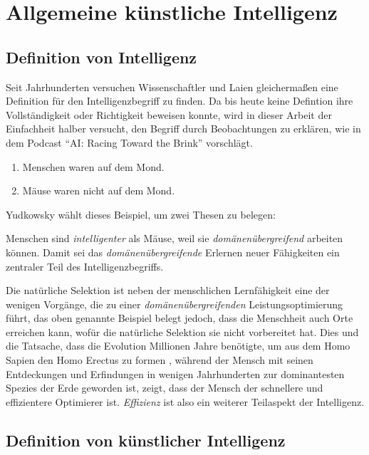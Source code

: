 \chapter{Allgemeine künstliche Intelligenz}
\section{Definition von Intelligenz}
Seit Jahrhunderten versuchen Wissenschaftler und Laien gleichermaßen eine Definition für den Intelligenzbegriff zu finden. Da bis heute keine Defintion ihre Vollständigkeit oder Richtigkeit beweisen konnte, wird in dieser Arbeit der Einfachheit halber versucht, den Begriff durch Beobachtungen zu erklären, wie \citeauthor{EliezerPodcast} in dem Podcast \enquote{AI: Racing Toward the Brink} vorschlägt. 
\begin{enumerate}
\item Menschen waren auf dem Mond.
\item Mäuse waren nicht auf dem Mond.
\end{enumerate}
Yudkowsky wählt dieses Beispiel, um zwei Thesen zu belegen:

Menschen sind \emph{intelligenter} als Mäuse, weil sie \emph{domänenübergreifend} arbeiten können. Damit sei das \emph{domänenübergreifende} Erlernen neuer Fähigkeiten ein zentraler Teil des Intelligenzbegriffs.


Die natürliche Selektion ist neben der menschlichen Lernfähigkeit eine der wenigen Vorgänge, die zu einer \emph{domänenübergreifenden} Leistungsoptimierung führt, das oben genannte Beispiel belegt jedoch, dass die Menschheit auch Orte erreichen kann, wofür die natürliche Selektion sie nicht vorbereitet hat. Dies und die Tatsache, dass die Evolution Millionen Jahre benötigte, um aus dem Homo Sapien den Homo Erectus zu formen , während der Mensch mit seinen Entdeckungen und Erfindungen in wenigen Jahrhunderten zur dominantesten Spezies der Erde geworden ist, zeigt, dass der Mensch der schnellere und effizientere Optimierer ist. \emph{Effizienz} ist also ein weiterer Teilaspekt der Intelligenz.

\section{Definition von künstlicher Intelligenz}

